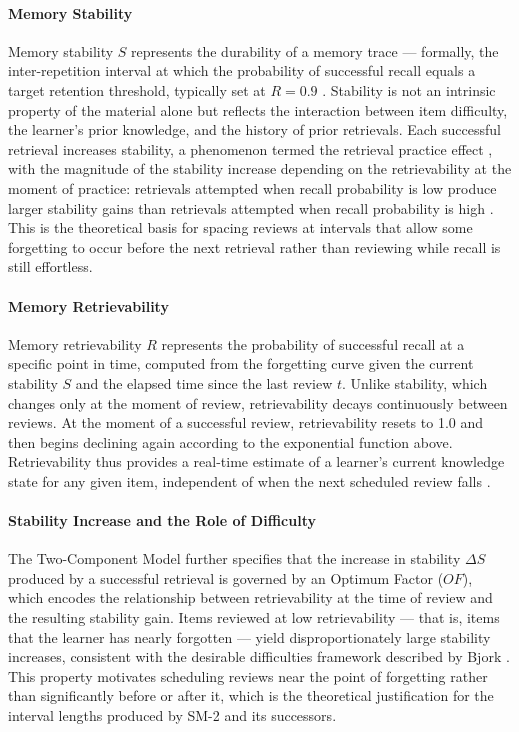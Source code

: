 \paragraph{Memory Stability}
Memory stability $S$ represents the durability of a memory trace — formally, the inter-repetition interval at which the probability of successful recall equals a target retention threshold, typically set at $R = 0.9$ \cite{wozniak1995twocomponents}. Stability is not an intrinsic property of the material alone but reflects the interaction between item difficulty, the learner's prior knowledge, and the history of prior retrievals. Each successful retrieval increases stability, a phenomenon termed the retrieval practice effect \cite{roediger2006}, with the magnitude of the stability increase depending on the retrievability at the moment of practice: retrievals attempted when recall probability is low produce larger stability gains than retrievals attempted when recall probability is high \cite{bjork1994}. This is the theoretical basis for spacing reviews at intervals that allow some forgetting to occur before the next retrieval rather than reviewing while recall is still effortless.

\paragraph{Memory Retrievability}
Memory retrievability $R$ represents the probability of successful recall at a specific point in time, computed from the forgetting curve given the current stability $S$ and the elapsed time since the last review $t$. Unlike stability, which changes only at the moment of review, retrievability decays continuously between reviews. At the moment of a successful review, retrievability resets to 1.0 and then begins declining again according to the exponential function above. Retrievability thus provides a real-time estimate of a learner's current knowledge state for any given item, independent of when the next scheduled review falls \cite{wozniak1995twocomponents}.

\paragraph{Stability Increase and the Role of Difficulty}
The Two-Component Model further specifies that the increase in stability $\Delta S$ produced by a successful retrieval is governed by an Optimum Factor ($OF$), which encodes the relationship between retrievability at the time of review and the resulting stability gain. Items reviewed at low retrievability — that is, items that the learner has nearly forgotten — yield disproportionately large stability increases, consistent with the desirable difficulties framework described by Bjork \cite{bjork1994}. This property motivates scheduling reviews near the point of forgetting rather than significantly before or after it, which is the theoretical justification for the interval lengths produced by SM-2 and its successors.

